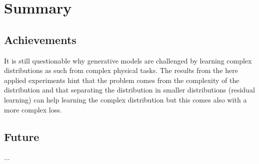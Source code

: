\chapter{Summary}
\label{cha:summary}

	
	
	\section{Achievements}
	\label{sec:sum-reached}
		It is still questionable why generative models are challenged by learning complex distributions as such from complex physical tasks. The results from the here applied experiments hint that the problem comes from the complexity of the distribution and that separating the distribution in smaller distributions (residual learning) can help learning the complex distribution but this comes also with a more complex loss.
	
	\section{Future}
	\label{sec:sum-future}
		...
	
	
	